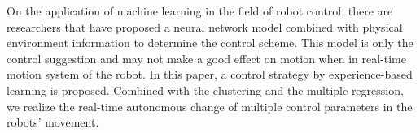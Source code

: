 On the application of machine learning in the field of robot control, there are researchers that have proposed a neural network model combined with physical environment information to determine the control scheme\cite{InformationDriven}\cite{NovelPlasticityRule}\cite{MissileSystems}\cite{NeuroFuzzyBayesian}. This model is only the control suggestion and may not make a good effect on motion when in real-time motion system of the robot. In this paper, a control strategy by experience-based learning  is proposed. Combined with the clustering and the multiple regression, we realize the real-time autonomous change of multiple control parameters in the robots' movement.
